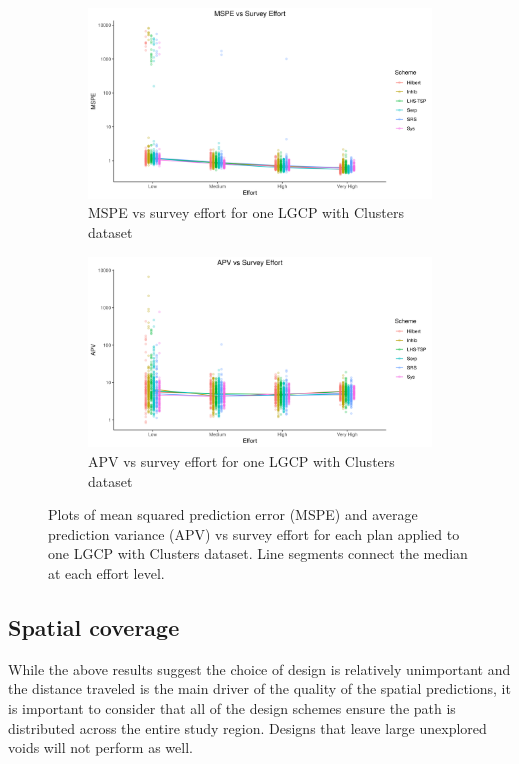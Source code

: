 \documentclass[review]{elsarticle}
\begin{document}
\begin{figure}

\begin{subfigure}{4.5in}
\includegraphics[width=4.5in]{../graphics/MSPE-effort-notpaneled-Cluster000004.png}
\caption{MSPE vs survey effort for one LGCP with Clusters dataset}
\label{mspeclust}
\end{subfigure}

\begin{subfigure}{4.5in}
\includegraphics[width=4.5in]{../graphics/APV-effort-notpaneled-Cluster000004.png}
\caption{APV vs survey effort for one LGCP with Clusters dataset}
\label{apvclust}
\end{subfigure}

\caption{Plots of mean squared prediction error (MSPE) and average prediction
variance (APV) vs survey effort for each plan applied to one LGCP with Clusters
dataset. Line segments connect the median at each effort level.}
\label{clustresults}
\end{figure}


\subsection{Spatial coverage}

While the above results suggest the choice of design is relatively unimportant
and the distance traveled is the main driver of the quality of the spatial
predictions, it is important to consider that all of the design schemes ensure
the path is distributed across the entire study region. Designs that leave
large unexplored voids will not perform as well.
\end{document}
